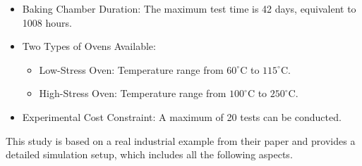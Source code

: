 \begin{itemize}
\item Baking Chamber Duration: The maximum test time is 42 days, equivalent to 1008 hours.

\item Two Types of Ovens Available:

\begin{itemize}
\item Low-Stress Oven: Temperature range from $60^\circ\text{C}$ to $115^\circ\text{C}$.
\item High-Stress Oven: Temperature range from $100^\circ\text{C}$ to $250^\circ\text{C}$.
\end{itemize}

\item Experimental Cost Constraint: A maximum of 20 tests can be conducted.

\end{itemize}

\hspace*{8mm} This study is based on a real industrial example from their paper and provides a detailed simulation setup, which includes all the following aspects.

